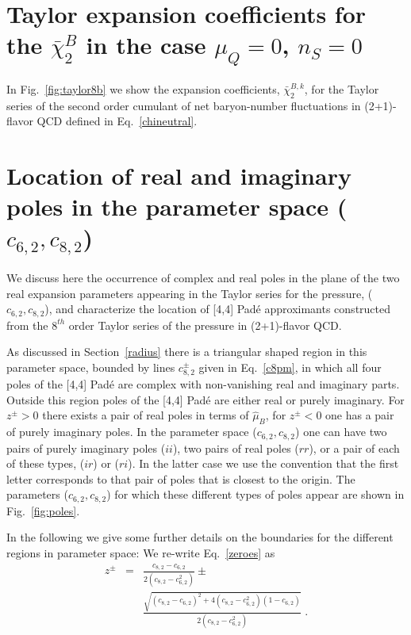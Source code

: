 \documentclass[pdflatex,prd,twocolumn,showpacs,superscriptaddress,nofootinbib]{revtex4-1}
\newcommand \hmu {\hat{\mu}}
\newcommand \cb {\bar{\chi}}
\begin{document}
\section{Taylor expansion coefficients
for the \boldmath$\cb_2^B$ in the case $\mu_Q=0$, $n_S=0$}
\label{app:chi2B}

In Fig.~\ref{fig:taylor8b} we show the expansion coefficients, $\cb_2^{B,k}$, for the Taylor series of
the second order cumulant of net baryon-number fluctuations in
(2+1)-flavor QCD defined in Eq.~\ref{chineutral}.

\section{Location of real and imaginary poles
in the parameter space \boldmath($c_{6,2},c_{8,2}$)}
\label{app:zpzm}
We discuss here the occurrence of complex and real
poles in the plane of the two real expansion parameters appearing in the Taylor series for the pressure, 
($c_{6,2},c_{8,2}$), and characterize the location 
of [4,4] Pad\'e approximants constructed from the $8^{th}$ order Taylor series of the pressure in (2+1)-flavor QCD.


As discussed in Section~\ref{radius}
there is a triangular shaped region in this parameter space, bounded by lines $c_{8,2}^\pm$
given in Eq.~\ref{c8pm}, in which all four poles of the
[4,4] Pad\'e are complex with non-vanishing real and imaginary parts. 
Outside this region  poles of the [4,4] Pad\'e are either real or purely imaginary.
For $z^\pm>0$ there exists a pair of real poles in terms of $\hmu_B$, for $z^\pm<0$ one has a pair of 
purely imaginary poles. In the parameter space 
($c_{6,2},c_{8,2}$) one can have two pairs of 
purely imaginary poles ($ii$), two pairs of 
real poles ($rr$), or a pair of each of these 
types, ($ir$) or ($ri$). In the latter case we 
use the convention that the first letter corresponds to that pair of poles that is closest 
to the origin. The parameters ($c_{6,2},c_{8,2}$)  for which these different types of poles appear are shown in Fig.~\ref{fig:poles}.

In the following we give some further details on the boundaries for the different regions in parameter space:
We re-write Eq.~\ref{zeroes} as
\begin{eqnarray}
z^\pm &=&\frac{c_{8,2} - c_{6,2}}{2 (c_{8,2} -c_{6,2}^2)} \pm \nonumber \\ 
&&\frac{\sqrt{(c_{8,2} - c_{6,2})^2 +4
(c_{8,2} -c_{6,2}^2) (1-c_{6,2})}}{2 (c_{8,2} -c_{6,2}^2)}\; .
\label{apzeroes}
\end{eqnarray}
\end{document}
